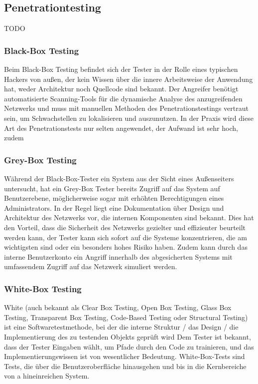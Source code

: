 \documentclass[12pt,oneside,a4paper,parskip]{scrbook}
\begin{document}
\subsection{Penetrationtesting}
TODO

\subsubsection{Black-Box Testing}
Beim Black-Box Testing befindet sich der Tester in der Rolle eines typischen Hackers von
außen, der kein Wissen über die innere Arbeitsweise der Anwendung hat, weder Architektur noch
Quellcode sind bekannt. Der Angreifer benötigt automatisierte Scanning-Tools für die
dynamische Analyse des anzugreifenden Netzwerks und muss mit manuellen Methoden des
Penetrationstestings vertraut sein, um Schwachstellen zu lokalisieren und auszunutzen.
In der Praxis wird diese Art des Penetrationstests nur selten angewendet, der Aufwand ist sehr hoch, zudem

\subsubsection{Grey-Box Testing}
Während der Black-Box-Tester ein System aus der Sicht eines Außenseiters untersucht, hat ein
Grey-Box Tester bereits Zugriff auf das System auf Benutzerebene, möglicherweise sogar mit
erhöhten Berechtigungen eines Administrators. In der Regel liegt eine Dokumentation über
Design und Architektur des Netzwerks vor, die internen Komponenten sind bekannt.
Dies hat den Vorteil, dass die Sicherheit des Netzwerks gezielter und effizienter beurteilt werden kann, der Tester kann sich sofort auf die Systeme konzentrieren, die am wichtigsten sind oder ein besonders hohes Risiko haben. Zudem kann durch das interne Benutzerkonto ein Angriff innerhalb des abgesicherten Systems mit umfassendem Zugriff auf das Netzwerk simuliert werden.

\subsubsection{White-Box Testing}
White (auch bekannt als Clear Box Testing, Open Box Testing, Glass Box Testing, Transparent Box Testing, Code-Based Testing oder Structural Testing) ist eine Softwaretestmethode, bei der die interne Struktur / das Design / die Implementierung des zu testenden Objekts geprüft wird Dem Tester ist bekannt, dass der Tester Eingaben wählt, um Pfade durch den Code zu trainieren, und das Implementierungswissen ist von wesentlicher Bedeutung. White-Box-Tests sind Tests, die über die Benutzeroberfläche hinausgehen und bis in die Kernbereiche von a hineinreichen System.
\end{document}
